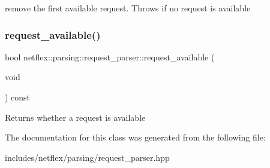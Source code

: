 remove the first available request. Throws if no request is available \mbox{\label{classnetflex_1_1parsing_1_1request__parser_aa0918393e460b72dec336ee75db7e2eb}} 
\subsubsection{\texorpdfstring{request\+\_\+available()}{request\_available()}}
{\footnotesize\ttfamily bool netflex\+::parsing\+::request\+\_\+parser\+::request\+\_\+available (\begin{DoxyParamCaption}\item[{void}]{ }\end{DoxyParamCaption}) const}

\begin{DoxyReturn}{Returns}
whether a request is available 
\end{DoxyReturn}


The documentation for this class was generated from the following file\+:\begin{DoxyCompactItemize}
\item 
includes/netflex/parsing/request\+\_\+parser.\+hpp\end{DoxyCompactItemize}
